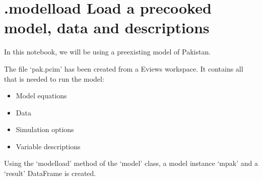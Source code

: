 \documentclass[letterpaper,10pt,english]{jupyterBook}
\begin{document}
\section{.modelload Load a pre\sphinxhyphen{}cooked model, data and descriptions}
\label{\detokenize{content/notebooks/modelflow_features:modelload-load-a-pre-cooked-model-data-and-descriptions}}
\sphinxAtStartPar
In this notebook, we will be using a pre\sphinxhyphen{}existing  model of Pakistan.

\sphinxAtStartPar
The file ‘pak.pcim’ has been created from a Eviews workspace. It contains all that is needed to run the model:
\begin{itemize}
\item {} 
\sphinxAtStartPar
Model equations

\item {} 
\sphinxAtStartPar
Data

\item {} 
\sphinxAtStartPar
Simulation options

\item {} 
\sphinxAtStartPar
Variable descriptions

\end{itemize}

\sphinxAtStartPar
Using the ‘modelload’ method of the  ‘model’ class, a model instance ‘mpak’ and a ‘result’ DataFrame is created.
\end{document}
